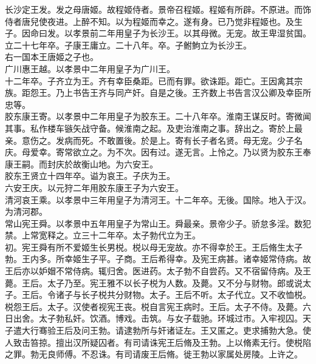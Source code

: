 \documentclass{zhvt-classic}
\begin{document}
\hspace*{2em}长沙定王发。发之母唐姬。故程姬侍者。景帝召程姬。程姬有所辟。不原进。而饰侍者唐兒使夜进。上醉不知。以为程姬而幸之。遂有身。已乃觉非程姬也。及生子。因命曰发。以孝景前二年用皇子为长沙王。以其母微。无宠。故王卑湿贫国。\\
\hspace*{2em}立二十七年卒。子康王庸立。二十八年。卒。子鲋鮈立为长沙王。\\
\hspace*{2em}右一国本王唐姬之子也。\\
\hspace*{2em}广川惠王越。以孝景中二年用皇子为广川王。\\
\hspace*{2em}十二年卒。子齐立为王。齐有幸臣桑距。已而有罪。欲诛距。距亡。王因禽其宗族。距怨王。乃上书告王齐与同产奸。自是之後。王齐数上书告言汉公卿及幸臣所忠等。\\
\hspace*{2em}胶东康王寄。以孝景中二年用皇子为胶东王。二十八年卒。淮南王谋反时。寄微闻其事。私作楼车镞矢战守备。候淮南之起。及吏治淮南之事。辞出之。寄於上最亲。意伤之。发病而死。不敢置後。於是上。寄有长子者名贤。母无宠。少子名庆。母爱幸。寄常欲立之。为不次。因有过。遂无言。上怜之。乃以贤为胶东王奉康王嗣。而封庆於故衡山地。为六安王。\\
\hspace*{2em}胶东王贤立十四年卒。谥为哀王。子庆为王。\\
\hspace*{2em}六安王庆。以元狩二年用胶东康王子为六安王。\\
\hspace*{2em}清河哀王乘。以孝景中三年用皇子为清河王。十二年卒。无後。国除。地入于汉。为清河郡。\\
\hspace*{2em}常山宪王舜。以孝景中五年用皇子为常山王。舜最亲。景帝少子。骄怠多淫。数犯禁。上常宽释之。立三十二年卒。太子勃代立为王。\\
\hspace*{2em}初。宪王舜有所不爱姬生长男棁。棁以母无宠故。亦不得幸於王。王后脩生太子勃。王内多。所幸姬生子平。子商。王后希得幸。及宪王病甚。诸幸姬常侍病。故王后亦以妒媢不常侍病。辄归舍。医进药。太子勃不自尝药。又不宿留侍病。及王薨。王后。太子乃至。宪王雅不以长子棁为人数。及薨。又不分与财物。郎或说太子。王后。令诸子与长子棁共分财物。太子。王后不听。太子代立。又不收恤棁。棁怨王后。太子。汉使者视宪王丧。棁自言宪王病时。王后。太子不侍。及薨。六日出舍。太子勃私奸。饮酒。博戏。击筑。与女子载驰。环城过市。入牢视囚。天子遣大行骞验王后及问王勃。请逮勃所与奸诸证左。王又匿之。吏求捕勃大急。使人致击笞掠。擅出汉所疑囚者。有司请诛宪王后脩及王勃。上以脩素无行。使棁陷之罪。勃无良师傅。不忍诛。有司请废王后脩。徙王勃以家属处房陵。上许之。\\
\end{document}
